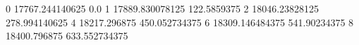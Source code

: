 0 17767.244140625 0.0
1 17889.830078125 122.5859375
2 18046.23828125 278.994140625
4 18217.296875 450.052734375
6 18309.146484375 541.90234375
8 18400.796875 633.552734375
